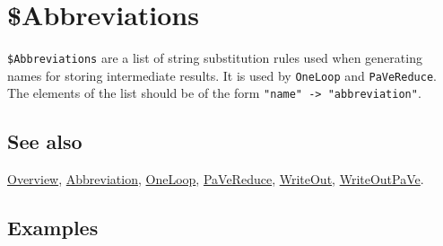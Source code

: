 \documentclass[../FeynCalcManual.tex]{subfiles}
\begin{document}
\hypertarget{abbreviations}{%
\section{\$Abbreviations}\label{abbreviations}}

\texttt{\$Abbreviations} are a list of string substitution rules used
when generating names for storing intermediate results. It is used by
\texttt{OneLoop} and \texttt{PaVeReduce}. The elements of the list
should be of the form \texttt{"name" -> "abbreviation"}.

\subsection{See also}

\hyperlink{toc}{Overview}, \hyperlink{abbreviation}{Abbreviation},
\hyperlink{oneloop}{OneLoop}, \hyperlink{pavereduce}{PaVeReduce},
\hyperlink{writeout}{WriteOut}, \hyperlink{writeoutpave}{WriteOutPaVe}.

\subsection{Examples}
\end{document}
